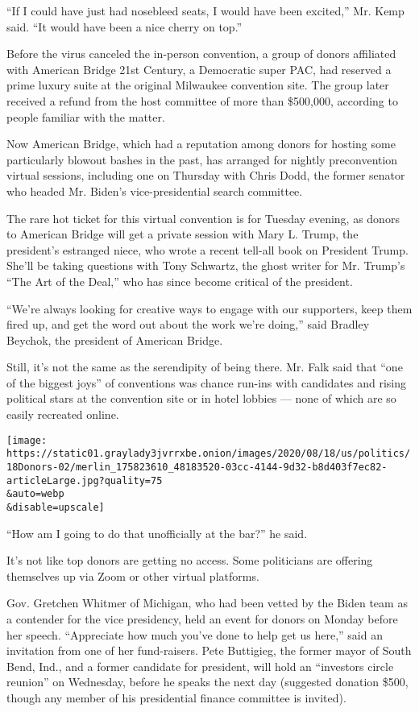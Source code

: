 ``If I could have just had nosebleed seats, I would have been excited,''
Mr. Kemp said. ``It would have been a nice cherry on top.''

Before the virus canceled the in-person convention, a group of donors
affiliated with American Bridge 21st Century, a Democratic super PAC,
had reserved a prime luxury suite at the original Milwaukee convention
site. The group later received a refund from the host committee of more
than \$500,000, according to people familiar with the matter.

Now American Bridge, which had a reputation among donors for hosting
some particularly blowout bashes in the past, has arranged for nightly
preconvention virtual sessions, including one on Thursday with Chris
Dodd, the former senator who headed Mr. Biden's vice-presidential search
committee.

The rare hot ticket for this virtual convention is for Tuesday evening,
as donors to American Bridge will get a private session with Mary L.
Trump, the president's estranged niece, who wrote a recent tell-all book
on President Trump. She'll be taking questions with Tony Schwartz, the
ghost writer for Mr. Trump's ``The Art of the Deal,'' who has since
become critical of the president.

``We're always looking for creative ways to engage with our supporters,
keep them fired up, and get the word out about the work we're doing,''
said Bradley Beychok, the president of American Bridge.

Still, it's not the same as the serendipity of being there. Mr. Falk
said that ``one of the biggest joys'' of conventions was chance run-ins
with candidates and rising political stars at the convention site or in
hotel lobbies --- none of which are so easily recreated online.

\texttt{[image: https://static01.graylady3jvrrxbe.onion/images/2020/08/18/us/politics/18Donors-02/merlin\_175823610\_48183520-03cc-4144-9d32-b8d403f7ec82-articleLarge.jpg?quality=75\\\&auto=webp\\\&disable=upscale]}

``How am I going to do that unofficially at the bar?'' he said.

It's not like top donors are getting no access. Some politicians are
offering themselves up via Zoom or other virtual platforms.

Gov. Gretchen Whitmer of Michigan, who had been vetted by the Biden team
as a contender for the vice presidency, held an event for donors on
Monday before her speech. ``Appreciate how much you've done to help get
us here,'' said an invitation from one of her fund-raisers. Pete
Buttigieg, the former mayor of South Bend, Ind., and a former candidate
for president, will hold an ``investors circle reunion'' on Wednesday,
before he speaks the next day (suggested donation \$500, though any
member of his presidential finance committee is invited).

